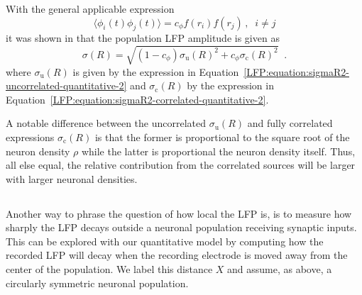 With the general applicable expression
\begin{equation}
\langle \phi_i(t) \phi_j(t) \rangle= c_\phi f(r_i) f(r_j)\, , \;\; i \neq j
\label{LFP:box:equation:phii-phij}
\end{equation}
it was shown in  that the population LFP amplitude is given as
\begin{equation}
  \sigma(R)=\sqrt{(1-c_\phi) \sigma_\text{u}(R)^2 +  c_\phi \sigma_\text{c}(R)^2}\;\;.
  \label{LFP:box:equation:sigmaR}
\end{equation}
where $\sigma_\text{u}(R)$ is given by the expression in Equation~\ref{LFP:equation:sigmaR2-uncorrelated-quantitative-2} and
 $\sigma_\text{c}(R)$ by the expression in Equation~\ref{LFP:equation:sigmaR2-correlated-quantitative-2}.

A notable difference between the uncorrelated $\sigma_\text{u}(R)$ and fully correlated expressions $\sigma_\text{c}(R)$ is that 
the former is proportional to the square root of the neuron density $\rho$ while the latter is proportional the neuron density itself.
Thus, all else equal, the relative contribution from the correlated sources will be larger with larger neuronal densities. 


\subsection{}

Another way to phrase the question of how local the LFP is, is to measure how sharply the LFP decays outside a neuronal population receiving synaptic inputs.
This can be explored with our quantitative model by computing how the recorded LFP will decay when the recording electrode is moved away from the center of 
the population. We label this distance $X$ and assume, as above, a circularly symmetric neuronal population. 

